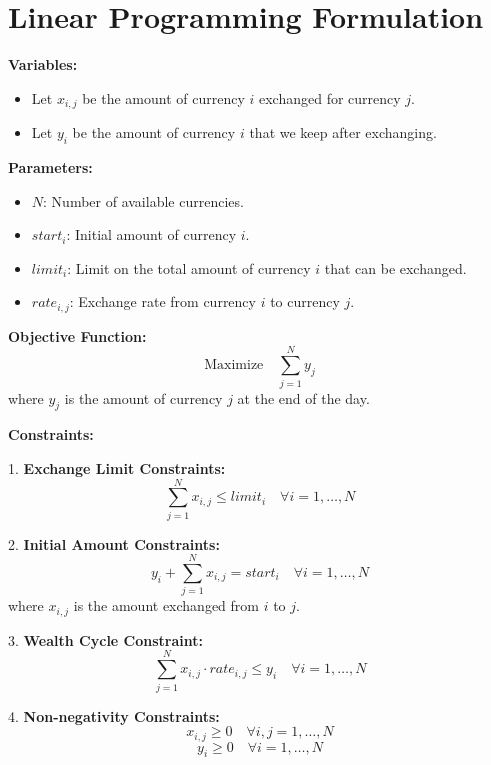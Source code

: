 \documentclass{article}
\begin{document}
\section*{Linear Programming Formulation}

\textbf{Variables:}
\begin{itemize}
    \item Let \( x_{i,j} \) be the amount of currency \( i \) exchanged for currency \( j \).
    \item Let \( y_i \) be the amount of currency \( i \) that we keep after exchanging.
\end{itemize}

\textbf{Parameters:}
\begin{itemize}
    \item \( N \): Number of available currencies.
    \item \( start_i \): Initial amount of currency \( i \).
    \item \( limit_i \): Limit on the total amount of currency \( i \) that can be exchanged.
    \item \( rate_{i,j} \): Exchange rate from currency \( i \) to currency \( j \).
\end{itemize}

\textbf{Objective Function:}
\[
\text{Maximize} \quad \sum_{j=1}^{N} y_j
\]
where \( y_j \) is the amount of currency \( j \) at the end of the day.

\textbf{Constraints:}

1. \textbf{Exchange Limit Constraints:}
\[
\sum_{j=1}^{N} x_{i,j} \leq limit_i \quad \forall i = 1, \ldots, N
\]

2. \textbf{Initial Amount Constraints:}
\[
y_i + \sum_{j=1}^{N} x_{i,j} = start_i \quad \forall i = 1, \ldots, N
\]
where \( x_{i,j} \) is the amount exchanged from \( i \) to \( j \).

3. \textbf{Wealth Cycle Constraint:}
\[
\sum_{j=1}^{N} x_{i,j} \cdot rate_{i,j} \leq y_i \quad \forall i = 1, \ldots, N
\]

4. \textbf{Non-negativity Constraints:}
\[
x_{i,j} \geq 0 \quad \forall i, j = 1, \ldots, N
\]
\[
y_i \geq 0 \quad \forall i = 1, \ldots, N
\]
\end{document}
